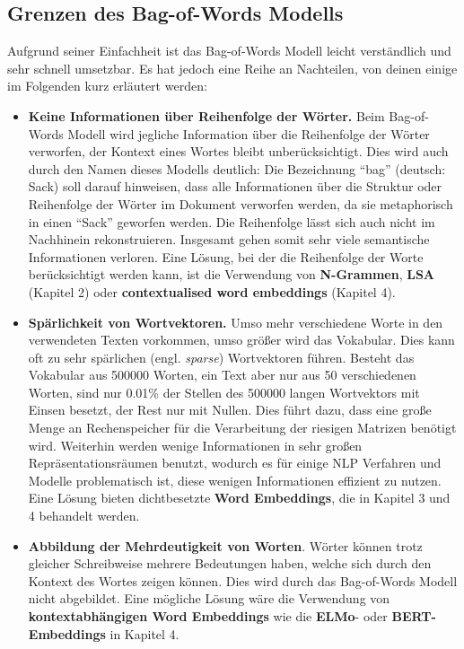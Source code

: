 \documentclass[11pt]{article}
\providecommand{\tightlist}{%
      \setlength{\itemsep}{0pt}\setlength{\parskip}{0pt}}
\begin{document}
    \hypertarget{grenzen-des-bag-of-words-modells}{%
\subsection{Grenzen des Bag-of-Words
Modells}\label{grenzen-des-bag-of-words-modells}}

Aufgrund seiner Einfachheit ist das Bag-of-Words Modell leicht
verständlich und sehr schnell umsetzbar. Es hat jedoch eine Reihe an
Nachteilen, von deinen einige im Folgenden kurz erläutert werden:

\begin{itemize}
\tightlist
\item
  \textbf{Keine Informationen über Reihenfolge der Wörter.} Beim
  Bag-of-Words Modell wird jegliche Information über die Reihenfolge der
  Wörter verworfen, der Kontext eines Wortes bleibt unberücksichtigt.
  Dies wird auch durch den Namen dieses Modells deutlich: Die
  Bezeichnung ``bag'' (deutsch: Sack) soll darauf hinweisen, dass alle
  Informationen über die Struktur oder Reihenfolge der Wörter im
  Dokument verworfen werden, da sie metaphorisch in einen ``Sack''
  geworfen werden. Die Reihenfolge lässt sich auch nicht im Nachhinein
  rekonstruieren. Insgesamt gehen somit sehr viele semantische
  Informationen verloren. Eine Lösung, bei der die Reihenfolge der Worte
  berücksichtigt werden kann, ist die Verwendung von \textbf{N-Grammen},
  \textbf{LSA} (Kapitel 2) oder \textbf{contextualised word embeddings}
  (Kapitel 4).
\item
  \textbf{Spärlichkeit von Wortvektoren.} Umso mehr verschiedene Worte
  in den verwendeten Texten vorkommen, umso größer wird das Vokabular.
  Dies kann oft zu sehr spärlichen (engl. \emph{sparse}) Wortvektoren
  führen. Besteht das Vokabular aus 500000 Worten, ein Text aber nur aus
  50 verschiedenen Worten, sind nur 0.01\% der Stellen des 500000 langen
  Wortvektors mit Einsen besetzt, der Rest nur mit Nullen. Dies führt
  dazu, dass eine große Menge an Rechenspeicher für die Verarbeitung der
  riesigen Matrizen benötigt wird. Weiterhin werden wenige Informationen
  in sehr großen Repräsentationsräumen benutzt, wodurch es für einige
  NLP Verfahren und Modelle problematisch ist, diese wenigen
  Informationen effizient zu nutzen. Eine Lösung bieten dichtbesetzte
  \textbf{Word Embeddings}, die in Kapitel 3 und 4 behandelt werden.
\item
  \textbf{Abbildung der Mehrdeutigkeit von Worten}. Wörter können trotz
  gleicher Schreibweise mehrere Bedeutungen haben, welche sich durch den
  Kontext des Wortes zeigen können. Dies wird durch das Bag-of-Words
  Modell nicht abgebildet. Eine mögliche Lösung wäre die Verwendung von
  \textbf{kontextabhängigen Word Embeddings} wie die \textbf{ELMo}- oder
  \textbf{BERT-Embeddings} in Kapitel 4.
\end{itemize}
\end{document}
